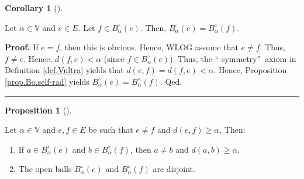 \documentclass[numbers=enddot,12pt,final,onecolumn,notitlepage]{scrartcl}%
\theoremstyle{definition}
\newtheorem{prop}[theo]{Proposition}
\newenvironment{proposition}[1][]
{\begin{prop}[#1]\begin{leftbar}}
{\end{leftbar}\end{prop}}
\newtheorem{coro}[theo]{Corollary}
\newenvironment{corollary}[1][]
{\begin{coro}[#1]\begin{leftbar}}
{\end{leftbar}\end{coro}}
\newenvironment{proof}[1][Proof]{\noindent\textbf{#1.} }{\ \rule{0.5em}{0.5em}}
\renewcommand{\geq}{\geqslant}
\theoremstyle{plainsl}
\begin{document}
\begin{corollary}
\label{cor.Bo.self-rad2}Let $\alpha\in\mathbb{V}$ and $e\in E$. Let $f\in
B_{\alpha}^{\circ}\left(  e\right)  $. Then, $B_{\alpha}^{\circ}\left(
e\right)  =B_{\alpha}^{\circ}\left(  f\right)  $.
\end{corollary}

\begin{proof}
If $e=f$, then this is obvious. Hence, WLOG assume that $e\neq f$. Thus,
$f\neq e$. Hence, $d\left(  f,e\right)  <\alpha$ (since $f\in B_{\alpha
}^{\circ}\left(  e\right)  $). Thus, the \textquotedblleft
symmetry\textquotedblright\ axiom in Definition \ref{def.Vultra} yields that
$d\left(  e,f\right)  =d\left(  f,e\right)  <\alpha$. Hence, Proposition
\ref{prop.Bo.self-rad} yields $B_{\alpha}^{\circ}\left(  e\right)  =B_{\alpha
}^{\circ}\left(  f\right)  $. Qed.
\end{proof}

\begin{proposition}
\label{prop.Bo.disjoint}Let $\alpha\in\mathbb{V}$ and $e,f\in E$ be such that
$e\neq f$ and $d\left(  e,f\right)  \geq\alpha$. Then:

\begin{enumerate}
\item[\textbf{(a)}] If $a\in B_{\alpha}^{\circ}\left(  e\right)  $ and $b\in
B_{\alpha}^{\circ}\left(  f\right)  $, then $a\neq b$ and $d\left(
a,b\right)  \geq\alpha$.

\item[\textbf{(b)}] The open balls $B_{\alpha}^{\circ}\left(  e\right)  $ and
$B_{\alpha}^{\circ}\left(  f\right)  $ are disjoint.
\end{enumerate}
\end{proposition}
\end{document}
